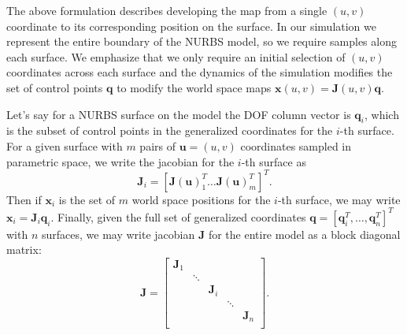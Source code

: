 The above formulation describes developing the map from a single $(u,v)$ coordinate to its corresponding position on the surface. In our simulation we represent the entire boundary of the NURBS model, so we require samples along each surface. We emphasize that we only require an initial selection of $(u,v)$ coordinates across each surface and the dynamics of the simulation modifies the set of control points $\mathbf{q}$ to modify the world space maps $\mathbf{x}(u,v)=\mathbf{J}(u,v)\mathbf{q}$.

Let's say for a NURBS surface on the model the DOF column vector is $\mathbf{q}_i$, which is the subset of control points in the generalized coordinates for the $i$-th surface. For a given surface with $m$ pairs of $\mathbf{u}=(u,v)$ coordinates sampled in parametric space, we write the jacobian for the $i$-th surface as 
\begin{equation}
\label{eqn:surface_jacobian}
    \mathbf{J}_i =
    \left[ \mathbf{J}(\mathbf{u})_1^T \dots \mathbf{J}(\mathbf{u})_m^T \right]^T
    \text{.}
\end{equation}
Then if $\mathbf{x}_i$ is the set of $m$ world space positions for the $i$-th surface, we may write $\mathbf{x}_i = \mathbf{J}_i \mathbf{q}_i$. Finally, given the full set of generalized coordinates $\mathbf{q} = \left[ \mathbf{q}_i^T, \dots, \mathbf{q}_n^T \right]^T$ with $n$ surfaces, we may write jacobian $\mathbf{J}$ for the entire model as a block diagonal matrix:
\begin{equation}
\mathbf{J} = \left[ \begin{array}{ccccc}
\mathbf{J}_1 &  &  &  &  \\
 & \ddots &  &  &  \\
 &  & \mathbf{J}_i & &  \\
 &  &  & \ddots &  \\
 &  &  &  & \mathbf{J}_n \\
\end{array} \right]
\text{.}
\end{equation}

